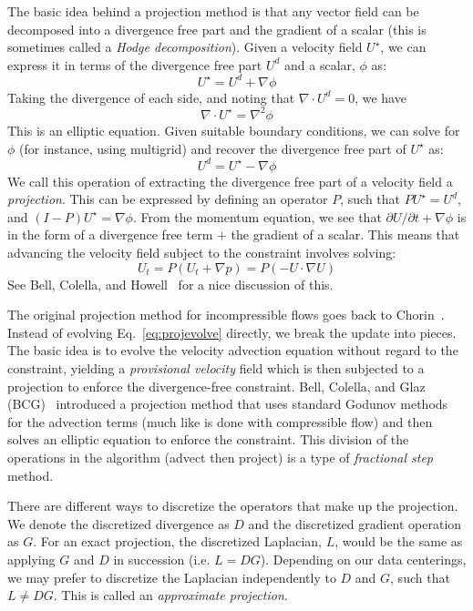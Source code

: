 The basic idea behind a projection method is that any vector field
can be decomposed into a divergence free part and the gradient of 
a scalar (this is sometimes called a {\em Hodge decomposition}).  
Given a velocity field $U^\star$, we can express it in terms of the 
divergence free part $U^d$ and a scalar, $\phi$ as:
\begin{equation}
U^\star = U^d + \nabla \phi
\end{equation}
Taking the divergence of each side, and noting that $\nabla \cdot U^d
= 0$, we have
\begin{equation}
\nabla \cdot U^\star = \nabla^2 \phi
\end{equation}
This is an elliptic equation.  Given suitable boundary conditions, we
can solve for $\phi$ (for instance, using multigrid) and recover the
divergence free part of $U^\star$ as:
\begin{equation}
U^d = U^\star - \nabla \phi
\end{equation}
We call this operation of extracting the divergence free part of a
velocity field a {\em projection}.  This can be expressed by defining
an operator $P$, such that $PU^\star = U^d$, and $(I - P)U^\star =
\nabla \phi$.  From the momentum equation, we see that $\partial
U/\partial t + \nabla \phi$ is in the form of a divergence free term
$+$ the gradient of a scalar.  This means that advancing the velocity
field subject to the constraint involves solving:
\begin{equation}
U_t = P(U_t + \nabla p) = P(-U\cdot \nabla U)
\label{eq:projevolve}
\end{equation}
See Bell, Colella, and Howell~\cite{BCH} for a nice discussion of this.

The original projection method for incompressible flows goes back to
Chorin~\cite{chorin:1968}.  Instead of evolving
Eq.~\ref{eq:projevolve} directly, we break the update into pieces.
The basic idea is to evolve the velocity advection equation without
regard to the constraint, yielding a {\em provisional velocity} field
which is then subjected to a projection to enforce the divergence-free
constraint.  Bell, Colella, and Glaz (BCG)~\cite{BCG} introduced a projection
method that uses standard Godunov methods for the advection terms
(much like is done with compressible flow) and then solves an elliptic
equation to enforce the constraint.  This division of the operations
in the algorithm (advect then project) is a type of {\em fractional
  step} method.

There are different ways to discretize the operators that make up the
projection.  We denote the discretized divergence as $D$ and the
discretized gradient operation as $G$.  For an exact projection, the
discretized Laplacian, $L$, would be the same as applying $G$ and $D$
in succession (i.e. $L = DG$).  Depending on our data centerings, we
may prefer to discretize the Laplacian independently to $D$ and $G$,
such that $L \ne DG$.  This is called an {\em approximate projection}.

